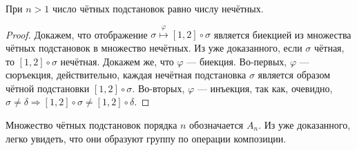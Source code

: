 \begin{theorem}
    При $n > 1$ число чётных подстановок равно числу нечётных.
\end{theorem}

\begin{proof}
    Докажем, что отображение $\sigma \overset{\varphi}{\mapsto} [1, 2]\circ\sigma$ является биекцией из множества чётных подстановок в множество нечётных. Из уже доказанного, если $\sigma$ чётная, то $[1, 2]\circ\sigma$ нечётная. Докажем же, что $\varphi$ --- биекция. Во-первых, $\varphi$ --- сюръекция, действительно, каждая нечётная подстановка $\sigma$ является образом чётной подстановки $[1, 2]\circ\sigma$. Во-вторых, $\varphi$ --- инъекция, так как, очевидно, $\sigma \ne \delta \Rightarrow [1, 2]\circ\sigma \ne [1, 2]\circ\delta$.
\end{proof}

\begin{remark}
    Множество чётных подстановок порядка $n$ обозначается $A_n$. Из уже доказанного, легко увидеть, что они образуют группу по операции композиции.
\end{remark}


